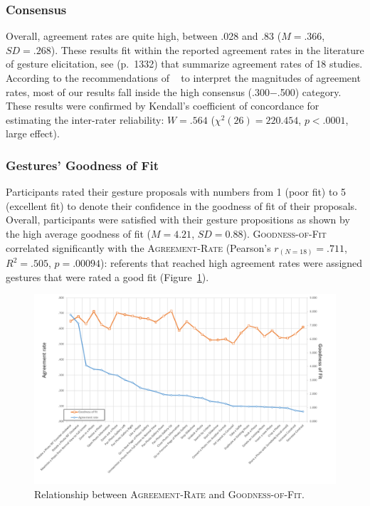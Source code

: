 \subsubsection{Consensus}
Overall, agreement rates are quite high, between .028 and .83 ($M{=}.366$, $SD{=}.268$). These results fit within the reported agreement rates in the literature of gesture elicitation, see \cite{Vatavu:2015} (\mbox{p. 1332}) that summarize agreement rates of 18 studies. According to the recommendations of ~\cite{Vatavu:2015} to interpret the magnitudes of agreement rates, most of our results fall inside the high consensus (.300$-$.500) category. These results were confirmed by Kendall's coefficient of concordance for estimating the inter-rater reliability: $W{=}.564$ ($\chi^2(26){=}220.454$, $p{<}.0001$, large effect).

\subsubsection{Gestures' Goodness of Fit}
Participants rated their gesture proposals with numbers from 1 (poor fit) to 5 (excellent fit) to denote their confidence in the goodness of fit of their proposals. Overall, participants were satisfied with their gesture propositions as shown by the high average goodness of fit ($M{=}4.21$, $SD{=}0.88$).
\textsc{Goodness-of-Fit} correlated significantly with the \textsc{Agreement-Rate} (Pearson's $r_{(N{=}18)}{=}.711$, $R^2{=}.505$, $p{=}.00094$): referents that reached high agreement rates were assigned gestures that were rated a good fit (Figure~\ref{fig:goodness-of-fit}).

\begin{figure}
    \centering
    \captionsetup{justification=centering}
    \includegraphics[width=.99\linewidth]{Figures/App-LUIGES/goodness-of-fit.pdf}
    \caption{Relationship between \textsc{Agreement-Rate} and \textsc{Goodness-of-Fit}.}
    \label{fig:goodness-of-fit}
\end{figure}


